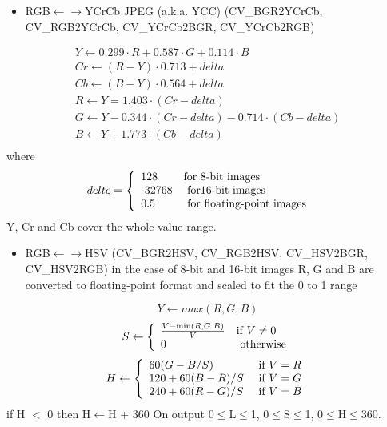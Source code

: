 \documentclass{article}
\begin{document}
\begin{itemize}
\item RGB$\leftarrow \to $YCrCb JPEG (a.k.a. YCC) (CV{\_}BGR2YCrCb, CV{\_}RGB2YCrCb, CV{\_}YCrCb2BGR, CV{\_}YCrCb2RGB)
\end{itemize}
\[
\begin{array}{c}
 Y\leftarrow 0.299\cdot R+0.587\cdot G+0.114\cdot B \\
 Cr\leftarrow (R-Y)\cdot 0.713+delta \\
 Cb\leftarrow (B-Y)\cdot 0.564+delta \\
 R\leftarrow Y=1.403\cdot (Cr-delta) \\
 G\leftarrow Y-0.344\cdot (Cr-delta)-0.714\cdot (Cb-delta) \\
 B\leftarrow Y+1.773\cdot (Cb-delta) \\
 \end{array}
\]
where
\[
delte=\left\{ {{\begin{array}{*{20}c}
 {\mbox{128}} \hfill & {\mbox{for 8-bit images}} \hfill \\
 {\mbox{ 32768}} \hfill & {\mbox{ for16-bit images}} \hfill \\
 {\mbox{0.5}} \hfill & {\mbox{ for floating-point images}} \hfill \\
\end{array} }{\begin{array}{*{20}c}
 {\mbox{ }} \hfill \\
 {\mbox{ }} \hfill \\
 {\mbox{ }} \hfill \\
\end{array} }} \right.
\]
Y, Cr and Cb cover the whole value range.

\begin{itemize}
\item RGB$\leftarrow \to $HSV (CV{\_}BGR2HSV, CV{\_}RGB2HSV, CV{\_}HSV2BGR, CV{\_}HSV2RGB) in the case of 8-bit and 16-bit images R, G and B are converted to floating-point format and scaled to fit the 0 to 1 range
\end{itemize}
\[
Y\leftarrow max(R,G,B)
\]
\[
S\leftarrow \left\{ {{\begin{array}{*{20}c}
 {\frac{V-\min (R,G.B)}{V}} \hfill & {\mbox{if }V\ne 0} \hfill \\
 0 \hfill & {\mbox{ otherwise}} \hfill \\
\end{array} }} \right.
\]
\[
H\leftarrow \left\{ {{\begin{array}{*{20}c}
 {60(G-B/S)} \hfill & {\mbox{ if }V=R} \hfill \\
 {120+60(B-R)/S} \hfill & {\mbox{ if }V=G} \hfill \\
 {240+60(R-G)/S} \hfill & {\mbox{ if }V=B} \hfill \\
\end{array} }} \right.
\]
if H $<$ 0 then H$\leftarrow $H + 360 On output 0$\le $L$\le $1, 0$\le
$S$\le $1, 0$\le $H$\le $360.
\end{document}
